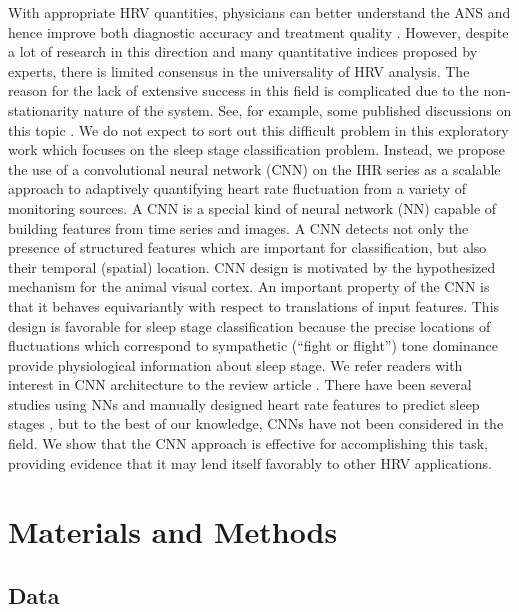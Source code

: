 \documentclass[10pt,a4paper,english]{amsart}
\begin{document}
With appropriate HRV quantities, physicians can better understand the ANS and hence improve both diagnostic accuracy and treatment quality \cite{Vanderlei_Pastre_Hoshi_Carvalho_Godoy:2009}.
However, despite a lot of research in this direction and many quantitative indices proposed by experts, there is limited consensus in the universality of HRV analysis. 
%
The reason for the lack of extensive success in this field is complicated due to the non-stationarity nature of the system. See, for example, some published discussions on this topic \cite{Pincus1994,Glass2009}. We do not expect to sort out this difficult problem in this exploratory work which focuses on the sleep stage classification problem.
%
Instead, we propose the use of a convolutional neural network (CNN) on the IHR series as a scalable approach to adaptively quantifying heart rate fluctuation from a variety of monitoring sources. A CNN \cite{LeCun1998} is a special kind of neural network (NN) capable of building features from time series and images. A CNN detects not only the presence of structured features which are important for classification, but also their temporal (spatial) location. CNN design is motivated by the hypothesized mechanism for the animal visual cortex. An important property of the CNN is that it behaves equivariantly with respect to translations of input features. This design is favorable for sleep stage classification because the precise locations of fluctuations which correspond to sympathetic (``fight or flight'') tone dominance provide physiological information about sleep stage. We refer readers with interest in CNN architecture to the review article \cite{LeCun2015}.   
%
There have been several studies using NNs and manually designed heart rate features to predict sleep stages \cite{Lewicke2005,Aktaruzzaman2015}, but to the best of our knowledge, CNNs have not been considered in the field.   
We show that the CNN approach is effective for accomplishing this task, providing evidence that it may lend itself favorably to other HRV applications.

\section{Materials and Methods}\label{sec: Materials}

\subsection{Data}
\end{document}
